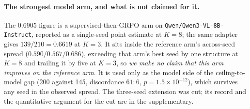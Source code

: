 \paragraph{The strongest model arm, and what is not claimed for it.}
The 0.6905 figure is a supervised-then-GRPO arm on \texttt{Qwen/Qwen3-VL-8B-Instruct}, reported as a
single-seed point estimate at $K{=}8$; the same adapter gives $139/210 = 0.6619$ at $K{=}3$. It sits inside
the reference arm's across-seed spread ($0.590 / 0.567 / 0.686$), exceeding that arm's best seed by one
structure at $K{=}8$ and trailing it by five at $K{=}3$, so \emph{we make no claim that this arm improves
on the reference arm}. It is used only as the model side of the ceiling-to-model gap (200 against 145,
discordance $61{:}6$, $p = 1.5\times10^{-12}$), which survives any seed in the observed spread. The
three-seed extension was cut; its record and the quantitative argument for the cut are in the
supplementary.
